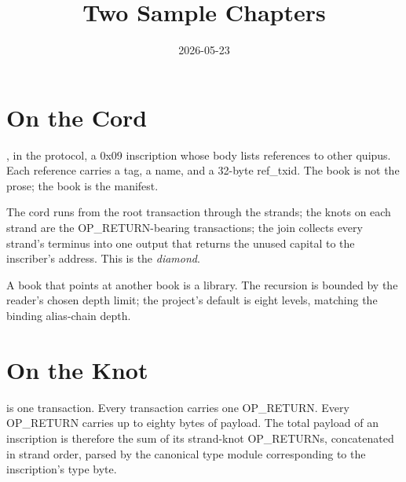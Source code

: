 \documentclass[book,tone=ordinary]{../colegio}
\title{Two Sample Chapters}
\date{2026-05-23}
\begin{document}
\maketitle

\frontmatter
\tableofcontents

\mainmatter

\chapter{On the Cord}

, in the protocol, a 0x09 inscription whose body lists
references to other quipus. Each reference carries a tag, a name, and
a 32-byte ref\_txid. The book is not the prose; the book is the
manifest.

The cord runs from the root transaction through the strands; the knots
on each strand are the OP\_RETURN-bearing transactions; the join
collects every strand's terminus into one output that returns the
unused capital to the inscriber's address. This is the
\emph{diamond}.

A book that points at another book is a library. The recursion is
bounded by the reader's chosen depth limit; the project's default is
eight levels, matching the binding alias-chain depth.

\chapter{On the Knot}

 is one transaction. Every transaction carries one
OP\_RETURN. Every OP\_RETURN carries up to eighty bytes of payload.
 The total payload of an inscription is therefore the sum of
its strand-knot OP\_RETURNs, concatenated in strand order, parsed by
the canonical type module corresponding to the inscription's type
byte.
\end{document}
